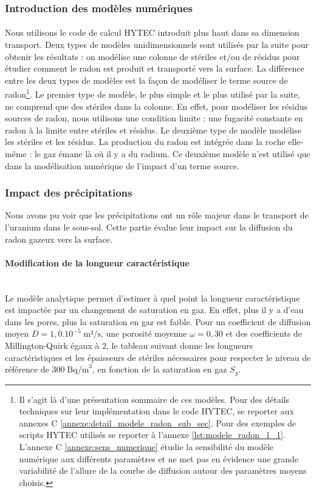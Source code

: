 \documentclass{article}
\begin{document}
\subsubsection{Introduction des modèles numériques}

\paragraph{} Nous utilisons le code de calcul HYTEC introduit plus haut dans sa dimension transport. Deux types de modèles unidimensionnels sont utilisés par la suite pour obtenir les résultats : on modélise une colonne de stériles et/ou de résidus pour étudier comment le radon est produit et transporté vers la surface. La différence entre les deux types de modèles est la façon de modéliser le terme source de radon\footnote{Il s’agit là d’une présentation sommaire de ces modèles. Pour des détails techniques sur leur implémentation dans le code HYTEC, se reporter aux annexes C \ref{annexe:detail_modele_radon_sub_sec}. Pour des exemples de scripts HYTEC utilisés se reporter à l'annexe \ref{lst:modele_radon_1_1}. L'annexe C \ref{annexe:sens_numerique} étudie la sensibilité du modèle numérique aux différents paramètres et ne met pas en évidence une grande variabilité de l'allure de la courbe de diffusion autour des paramètres moyens choisis.}. Le premier type de modèle, le plus simple et le plus utilisé par la suite, ne comprend que des stériles dans la colonne. En effet, pour modéliser les résidus sources de radon, nous utilisons une condition limite : une fugacité constante en radon à la limite entre stériles et résidus. Le deuxième type de modèle modélise les stériles et les résidus. La production du radon est intégrée dans la roche elle-même : le gaz émane là où il y a du radium. Ce deuxième modèle n'est utilisé que dans la modélisation numérique de l'impact d'un terme source.


\subsubsection{Impact des précipitations}

Nous avons pu voir que les précipitations ont un rôle majeur dans le transport de l'uranium dans le sous-sol. Cette partie évalue leur impact sur la diffusion du radon gazeux vers la surface.

\paragraph{Modification de la longueur caractéristique \\ \\}
Le modèle analytique permet d'estimer à quel point la longueur caractéristique est impactée par un changement de saturation en gaz. En effet, plus il y a d’eau dans les pores, plus la saturation en gaz est faible. Pour un coefficient de diffusion moyen $D=1,0.10^{-5} \; \text{m²/s}$, une porosité moyenne $\omega=0,30$ et des coefficients de Millington-Quirk égaux à 2, le tableau suivant donne les longueurs caractéristiques et les épaisseurs de stériles nécessaires pour respecter le niveau de référence de $300\; \text{Bq/m}^3$, en fonction de la saturation en gaz $S_g$. 
\end{document}
